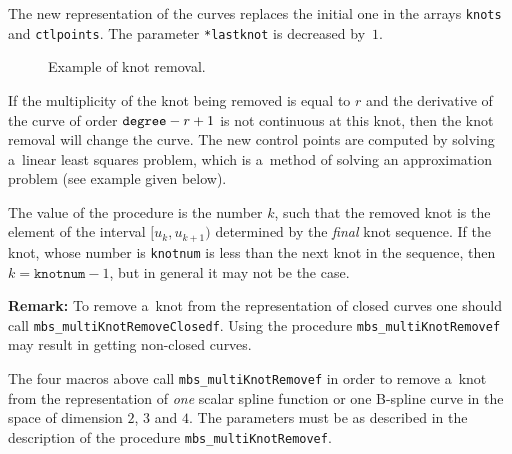 The new representation of the curves replaces the initial one
in the arrays \texttt{knots} and \texttt{ctlpoints}. The parameter
\texttt{*lastknot} is decreased by~$1$.

\begin{figure}[b]
  \centerline{}
  \caption{\label{fig:knotrem}Example of knot removal.}
\end{figure}
If the multiplicity of the knot being removed is equal to $r$ and the
derivative of the curve of order $\mbox{\texttt{degree}}-r+1$ is not
continuous at this knot, then the knot removal will change the curve.
The new control points are computed by solving a~linear least squares
problem, which is a~method of solving an approximation problem
(see example given below).

The value of the procedure is the number $k$, such that the removed
knot is the element of the interval $[u_k,u_{k+1})$ determined by the
\emph{final} knot sequence. If the knot, whose number is
\texttt{knotnum} is less than the next knot in the sequence, then
$k=\texttt{knotnum}-1$, but in general it may not be the case.

\vspace{\medskipamount}
\noindent
\textbf{Remark:} To remove a~knot from the representation of closed curves
one should call \texttt{mbs\_multiKnotRemoveClosedf}.
Using the procedure \texttt{mbs\_multiKnotRemovef} may result in getting
non-closed curves.

\vspace{\bigskipamount}
The four macros above call \texttt{mbs\_multiKnotRemovef} in order to
remove a~knot from the representation of \emph{one} scalar spline function
or one B-spline curve in the space of dimension $2$, $3$ and $4$.
The parameters must be as described in the description of the procedure
\texttt{mbs\_multiKnotRemovef}.

